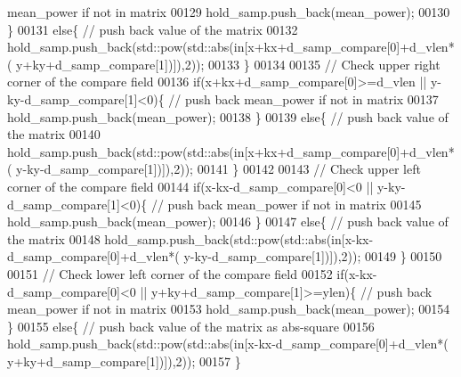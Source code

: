 \begin{DoxyCode}
{       mean\_power if not in matrix}
00129                             hold\_samp.push\_back(mean\_power);
00130                         \}
00131                         \textcolor{keywordflow}{else}\{ \textcolor{comment}{// push back value of the matrix}
00132                             hold\_samp.push\_back(std::pow(std::abs(in[x+kx+d\_samp\_compare[0]+d\_vlen*(
      y+ky+d\_samp\_compare[1])]),2));
00133                         \}
00134                         
00135                         \textcolor{comment}{// Check upper right corner of the compare field}
00136                         \textcolor{keywordflow}{if}(x+kx+d\_samp\_compare[0]>=d\_vlen || y-ky-d\_samp\_compare[1]<0)\{ \textcolor{comment}{// push back
       mean\_power if not in matrix}
00137                             hold\_samp.push\_back(mean\_power);
00138                         \}
00139                         \textcolor{keywordflow}{else}\{ \textcolor{comment}{// push back value of the matrix}
00140                             hold\_samp.push\_back(std::pow(std::abs(in[x+kx+d\_samp\_compare[0]+d\_vlen*(
      y-ky-d\_samp\_compare[1])]),2));
00141                         \}
00142                         
00143                         \textcolor{comment}{// Check upper left corner of the compare field}
00144                         \textcolor{keywordflow}{if}(x-kx-d\_samp\_compare[0]<0 || y-ky-d\_samp\_compare[1]<0)\{ \textcolor{comment}{// push back mean\_power
       if not in matrix}
00145                             hold\_samp.push\_back(mean\_power);
00146                         \}
00147                         \textcolor{keywordflow}{else}\{ \textcolor{comment}{// push back value of the matrix}
00148                             hold\_samp.push\_back(std::pow(std::abs(in[x-kx-d\_samp\_compare[0]+d\_vlen*(
      y-ky-d\_samp\_compare[1])]),2));
00149                         \}
00150                         
00151                         \textcolor{comment}{// Check lower left corner of the compare field}
00152                         \textcolor{keywordflow}{if}(x-kx-d\_samp\_compare[0]<0 || y+ky+d\_samp\_compare[1]>=ylen)\{ \textcolor{comment}{// push back
       mean\_power if not in matrix}
00153                             hold\_samp.push\_back(mean\_power);
00154                         \}
00155                         \textcolor{keywordflow}{else}\{ \textcolor{comment}{// push back value of the matrix as abs-square}
00156                             hold\_samp.push\_back(std::pow(std::abs(in[x-kx-d\_samp\_compare[0]+d\_vlen*(
      y+ky+d\_samp\_compare[1])]),2));
00157                         \}

\end{DoxyCode}
